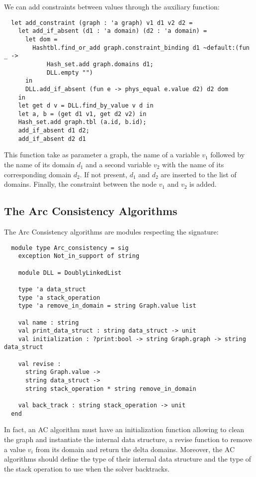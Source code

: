 \documentclass{rapport}
\begin{document}
We can add constraints between values through the auxiliary function:

\begin{verbatim}
  let add_constraint (graph : 'a graph) v1 d1 v2 d2 =
    let add_if_absent (d1 : 'a domain) (d2 : 'a domain) =
      let dom =
        Hashtbl.find_or_add graph.constraint_binding d1 ~default:(fun _ ->
            Hash_set.add graph.domains d1;
            DLL.empty "")
      in
      DLL.add_if_absent (fun e -> phys_equal e.value d2) d2 dom
    in
    let get d v = DLL.find_by_value v d in
    let a, b = (get d1 v1, get d2 v2) in
    Hash_set.add graph.tbl (a.id, b.id);
    add_if_absent d1 d2;
    add_if_absent d2 d1
\end{verbatim}

This function take as parameter a graph, the name of a variable $v_1$ followed by the name of its domain $d_1$ and a second variable $v_2$ with the name of its corresponding domain $d_2$. If not present, $d_1$ and $d_2$ are inserted to the list of domains. Finally, the constraint between the node $v_1$ and $v_2$ is added.


\subsection{The Arc Consistency Algorithms}
The Arc Consistency algorithms are modules respecting the signature:

\begin{verbatim}
  module type Arc_consistency = sig
    exception Not_in_support of string

    module DLL = DoublyLinkedList

    type 'a data_struct
    type 'a stack_operation
    type 'a remove_in_domain = string Graph.value list

    val name : string
    val print_data_struct : string data_struct -> unit
    val initialization : ?print:bool -> string Graph.graph -> string data_struct

    val revise :
      string Graph.value ->
      string data_struct ->
      string stack_operation * string remove_in_domain

    val back_track : string stack_operation -> unit
  end
\end{verbatim}

In fact, an AC algorithm must have an initialization function allowing to clean the graph and instantiate the internal data structure, a revise function to remove a value $v_i$ from its domain and return the delta domains. Moreover, the AC algorithms should define the type of their internal data structure and the type of the stack operation to use when the solver backtracks.
\end{document}
